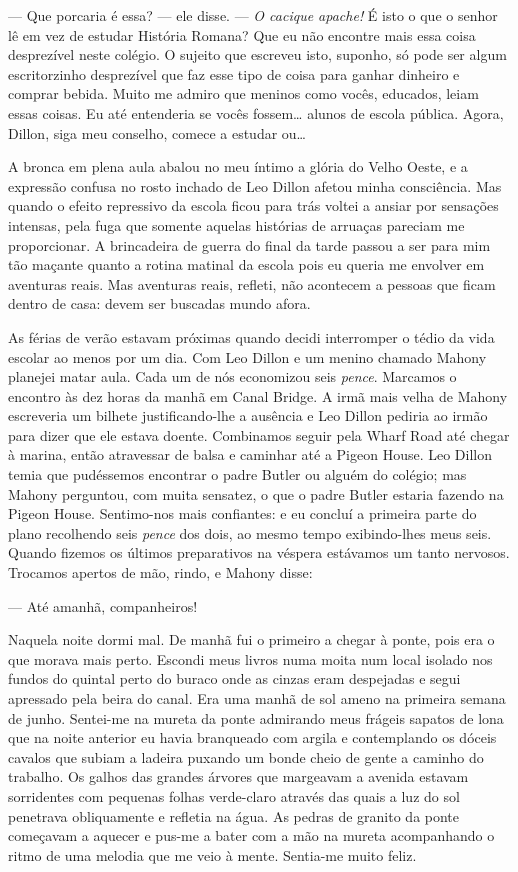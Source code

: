 --- Que porcaria é essa? --- ele disse.  --- \textit{O cacique apache!}  É isto
o que o senhor lê em vez de estudar História Romana?  Que eu não encontre mais
essa coisa desprezível neste colégio.  O sujeito que escreveu isto, suponho, só
pode ser algum escritorzinho desprezível que faz esse tipo de coisa para ganhar
dinheiro e comprar bebida.  Muito me admiro que meninos como vocês, educados,
leiam essas coisas.  Eu até entenderia se vocês fossem\ldots{} alunos de escola
pública.  Agora, Dillon, siga meu conselho, comece a estudar ou\ldots{}

A bronca em plena aula abalou no meu íntimo a glória do Velho Oeste, e a
expressão confusa no rosto inchado de Leo Dillon afetou minha consciência.  Mas
quando o efeito repressivo da escola ficou para trás voltei a ansiar por
sensações intensas, pela fuga que somente aquelas histórias de arruaças
pareciam me proporcionar.  A brincadeira de guerra do final da tarde passou a
ser para mim tão maçante quanto a rotina matinal da escola pois eu queria me
envolver em aventuras reais.  Mas aventuras reais, refleti, não acontecem a
pessoas que ficam dentro de casa: devem ser buscadas mundo afora.

As férias de verão estavam próximas quando decidi interromper o tédio da vida
escolar ao menos por um dia.  Com Leo Dillon e um menino chamado Mahony
planejei matar aula.  Cada um de nós economizou seis \textit{pence}.  Marcamos
o encontro às dez horas da manhã em Canal Bridge.  A irmã mais velha de Mahony
escreveria um bilhete justificando-lhe a ausência e Leo Dillon pediria ao irmão
para dizer que ele estava doente.  Combinamos seguir pela Wharf Road até chegar
à marina, então atravessar de balsa e caminhar até a Pigeon House.  Leo Dillon
temia que pudéssemos encontrar o padre Butler ou alguém do colégio; mas Mahony
perguntou, com muita sensatez, o que o padre Butler estaria fazendo na Pigeon
House.  Sentimo-nos mais confiantes: e eu concluí a primeira parte do plano
recolhendo seis \textit{pence} dos dois, ao mesmo tempo exibindo-lhes meus
seis.  Quando fizemos os últimos preparativos na véspera estávamos um tanto
nervosos.  Trocamos apertos de mão, rindo, e Mahony disse:

--- Até amanhã, companheiros!

Naquela noite dormi mal.  De manhã fui o primeiro a chegar à ponte, pois era o
que morava mais perto.  Escondi meus livros numa moita num local isolado nos
fundos do quintal perto do buraco onde as cinzas eram despejadas e segui
apressado pela beira do canal.  Era uma manhã de sol ameno na primeira semana
de junho.  Sentei-me na mureta da ponte admirando meus frágeis sapatos de lona
que na noite anterior eu havia branqueado com argila e contemplando os dóceis
cavalos que subiam a ladeira puxando um bonde cheio de gente a caminho do
trabalho.  Os galhos das grandes árvores que margeavam a avenida estavam
sorridentes com pequenas folhas verde-claro através das quais a luz do sol
penetrava obliquamente e refletia na água.  As pedras de granito da ponte
começavam a aquecer e pus-me a bater com a mão na mureta acompanhando o ritmo
de uma melodia que me veio à mente.  Sentia-me muito feliz.

